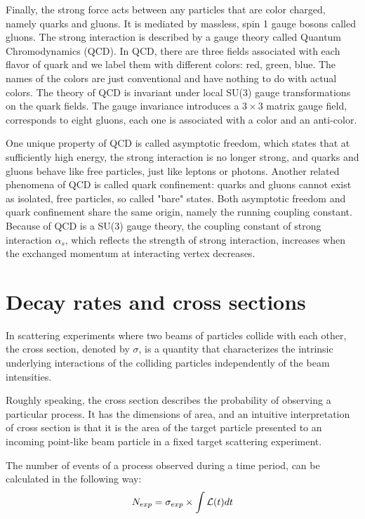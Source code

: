 Finally, the strong force acts between any particles that are color charged, namely quarks and gluons. It is mediated by massless, spin 1 gauge bosons called gluons. The strong interaction is described by a gauge theory called Quantum Chromodynamics (QCD). In QCD, there are three fields associated with each flavor of quark and we label them with different colors: red, green, blue. The names of the colors are just conventional and have nothing to do with actual colors. The theory of QCD is invariant under local SU(3) gauge transformations on the quark fields. The gauge invariance introduces a $3\times3$ matrix gauge field, corresponds to eight gluons, each one is associated with a color and an anti-color. 

One unique property of QCD is called asymptotic freedom, which states that at sufficiently high energy, the strong interaction is no longer strong, and quarks and gluons behave like free particles, just like leptons or photons. Another related phenomena of QCD is called quark confinement: quarks and gluons cannot exist as isolated, free particles, so called "bare" states. Both asymptotic freedom and quark confinement share the same origin, namely the running coupling constant. Because of QCD is a SU(3) gauge theory, the coupling constant of strong interaction $\alpha_s$, which reflects the strength of strong interaction, increases when the exchanged momentum at interacting vertex decreases.

\section{Decay rates and cross sections}

In scattering experiments where two beams of particles collide with each other, the cross section, denoted by $\sigma$, is a quantity that characterizes the intrinsic underlying interactions of the colliding particles independently of the beam intensities. 

Roughly speaking, the cross section describes the probability of observing a particular process. It has the dimensions of area, and an intuitive interpretation of cross section is that it is the area of the target particle presented to an incoming point-like beam particle in a fixed target scattering experiment. 

The number of events of a process observed during a time period, can be calculated in the following way:
\begin{equation}
N_{exp} = \sigma_{exp}\times\int\mathcal{L}(t)dt
\end{equation}

